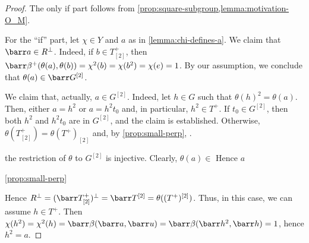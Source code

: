 \begin{proof}
    The only if part follows from \cref{prop:square-subgroup,lemma:motivation-O_M}. 
    
    For the ``if'' part, let $\chi \in Y$ and $a$ as in \cref{lemma:chi-defines-a}. 
    We claim that $\barr a \in R^\perp$. 
	Indeed, if $b \in T^+_{[2]}$, then $\barr\beta^+( \theta(a) , \theta(b) ) = \chi^2 (b) = \chi (b^2) = \chi (e) = 1$. 
	By our assumption, we conclude that $\theta(a) \in \barr G^{[2]}$. 
	
	We claim that, actually, $a\in G^{[2]}$. 
	Indeed, let $h\in G$ such that $\theta(h)^2 = \theta(a)$. 
	Then, either $a = h^2$ or $a = h^2t_0$ and, in particular, $h^2 \in T^+$. 
	If $t_0 \in G^{[2]}$, then both $h^2$ and $h^2 t_0$ are in $G^{[2]}$, and the claim is established. 
	Otherwise, $\theta(T^+_{[2]}) = \theta(T^+)_{[2]}$ and, by \cref{prop:small-perp}, .
	
	the restriction of $\theta$ to $G^{[2]}$ is injective. 
	Clearly, $\theta(a) \in $
	Hence $a$
	
	\cref{prop:small-perp}
	
	Hence $R^\perp = (\barr T^+_{[2]})^\perp = \barr T^{[2]} = \theta ((T^+)^{[2]})$. 
	Thus, in this case, we can assume $h\in T^+$. 
	Then $\chi(h^2) = \chi^2(h) = \barr \beta (\barr a, \barr u) = \barr \beta (\barr h^2, \barr h) =1$, hence $h^2 = a$. 
%	
\end{proof}


